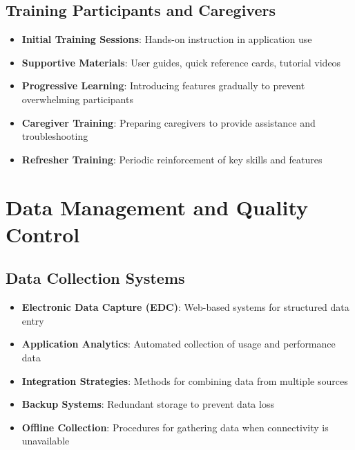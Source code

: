 \subsection{Training Participants and Caregivers}
\begin{itemize}
    \item \textbf{Initial Training Sessions}: Hands-on instruction in application use
    
    \item \textbf{Supportive Materials}: User guides, quick reference cards, tutorial videos
    
    \item \textbf{Progressive Learning}: Introducing features gradually to prevent overwhelming participants
    
    \item \textbf{Caregiver Training}: Preparing caregivers to provide assistance and troubleshooting
    
    \item \textbf{Refresher Training}: Periodic reinforcement of key skills and features
\end{itemize}

\section{Data Management and Quality Control}
\subsection{Data Collection Systems}
\begin{itemize}
    \item \textbf{Electronic Data Capture (EDC)}: Web-based systems for structured data entry
    
    \item \textbf{Application Analytics}: Automated collection of usage and performance data
    
    \item \textbf{Integration Strategies}: Methods for combining data from multiple sources
    
    \item \textbf{Backup Systems}: Redundant storage to prevent data loss
    
    \item \textbf{Offline Collection}: Procedures for gathering data when connectivity is unavailable
\end{itemize}

